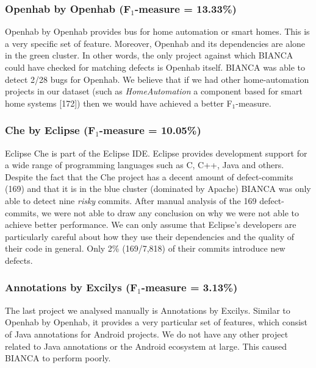 \documentclass[12pt]{report}
\begin{document}
\subsubsection{\texorpdfstring{Openhab by Openhab (F\(_1\)-measure =
13.33\%)}{Openhab by Openhab (F\_1-measure = 13.33\%)}}\label{openhab-by-openhab-fux5f1-measure-13.33}

Openhab by Openhab provides bus for home automation or smart homes. This
is a very specific set of feature. Moreover, Openhab and its
dependencies are alone in the green cluster. In other words, the only
project against which BIANCA could have checked for matching defects is
Openhab itself. BIANCA was able to detect 2/28 bugs for Openhab. We
believe that if we had other home-automation projects in our dataset
(such as \emph{HomeAutomation} a component based for smart home systems
{[}172{]}) then we would have achieved a better F\(_1\)-measure.

\subsubsection{\texorpdfstring{Che by Eclipse (F\(_1\)-measure =
10.05\%)}{Che by Eclipse (F\_1-measure = 10.05\%)}}\label{che-by-eclipse-fux5f1-measure-10.05}

Eclipse Che is part of the Eclipse IDE. Eclipse provides development
support for a wide range of programming languages such as C, C++, Java
and others. Despite the fact that the Che project has a decent amount of
defect-commits (169) and that it is in the blue cluster (dominated by
Apache) BIANCA was only able to detect nine \emph{risky} commits. After
manual analysis of the 169 defect-commits, we were not able to draw any
conclusion on why we were not able to achieve better performance. We can
only assume that Eclipse's developers are particularly careful about how
they use their dependencies and the quality of their code in general.
Only 2\% (169/7,818) of their commits introduce new defects.

\subsubsection{\texorpdfstring{Annotations by Excilys (F\(_1\)-measure =
3.13\%)}{Annotations by Excilys (F\_1-measure = 3.13\%)}}\label{annotations-by-excilys-fux5f1-measure-3.13}

The last project we analysed manually is Annotations by Excilys. Similar
to Openhab by Openhab, it provides a very particular set of features,
which consist of Java annotations for Android projects. We do not have
any other project related to Java annotations or the Android ecosystem
at large. This caused BIANCA to perform poorly.
\end{document}
